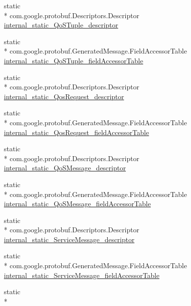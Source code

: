\begin{DoxyCompactItemize}
\item 
static \\*
com.\+google.\+protobuf.\+Descriptors.\+Descriptor \hyperlink{classeu_1_1uloop_1_1messages_1_1UloopMessages_a71572f7b64f17621962caf1d60d6d0ce}{internal\+\_\+static\+\_\+\+Qo\+S\+Tuple\+\_\+descriptor}
\item 
static \\*
com.\+google.\+protobuf.\+Generated\+Message.\+Field\+Accessor\+Table \hyperlink{classeu_1_1uloop_1_1messages_1_1UloopMessages_adc5d5ba5d04a4bad68a4e5a1cc834291}{internal\+\_\+static\+\_\+\+Qo\+S\+Tuple\+\_\+field\+Accessor\+Table}
\item 
static \\*
com.\+google.\+protobuf.\+Descriptors.\+Descriptor \hyperlink{classeu_1_1uloop_1_1messages_1_1UloopMessages_a03694238d664803cb53995373081e55b}{internal\+\_\+static\+\_\+\+Qos\+Request\+\_\+descriptor}
\item 
static \\*
com.\+google.\+protobuf.\+Generated\+Message.\+Field\+Accessor\+Table \hyperlink{classeu_1_1uloop_1_1messages_1_1UloopMessages_ad85d8a775bb9eeb1654ab1b19f5840ea}{internal\+\_\+static\+\_\+\+Qos\+Request\+\_\+field\+Accessor\+Table}
\item 
static \\*
com.\+google.\+protobuf.\+Descriptors.\+Descriptor \hyperlink{classeu_1_1uloop_1_1messages_1_1UloopMessages_a8415c0ad79f3b9782444e4077ab76783}{internal\+\_\+static\+\_\+\+Qo\+S\+Message\+\_\+descriptor}
\item 
static \\*
com.\+google.\+protobuf.\+Generated\+Message.\+Field\+Accessor\+Table \hyperlink{classeu_1_1uloop_1_1messages_1_1UloopMessages_a84f90631f9e489032752d82274ff45ce}{internal\+\_\+static\+\_\+\+Qo\+S\+Message\+\_\+field\+Accessor\+Table}
\item 
static \\*
com.\+google.\+protobuf.\+Descriptors.\+Descriptor \hyperlink{classeu_1_1uloop_1_1messages_1_1UloopMessages_a222acc27e2fff15cbd453c3b3e9d1021}{internal\+\_\+static\+\_\+\+Service\+Message\+\_\+descriptor}
\item 
static \\*
com.\+google.\+protobuf.\+Generated\+Message.\+Field\+Accessor\+Table \hyperlink{classeu_1_1uloop_1_1messages_1_1UloopMessages_a93347f1c47043928d4fcd134acde5089}{internal\+\_\+static\+\_\+\+Service\+Message\+\_\+field\+Accessor\+Table}
\item 
static \\*

\end{DoxyCompactItemize}
